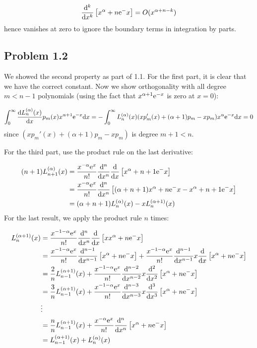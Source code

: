 \documentclass[12pt,a4paper]{article}
\def\D{ {\rm d} }
\def\E{ {\rm e} }
\def\dx{\D x}
\def\br[#1]{\left[{#1}\right]}
\begin{document}
\[
{\D^k \over \dx^k}\br[x^{\alpha+n}\E^{-x}]  = O(x^{\alpha+n-k})
\]
hence vanishes at zero to ignore the boundary terms in integration by parts.

\subsection{Problem 1.2}
We showed the second property as part of 1.1. For the first part, it is clear that we have the correct constant. Now we show orthogonality with all degree $m < n-1$ polynomials (using the fact that $x^{\alpha+1} \E^{-x}$ is zero at $x = 0$):

\[
\int_0^\infty {\D L_n^{(\alpha)}(x) \over \dx} p_m(x) x^{\alpha+1} \E^{-x} \dx = -\int_0^\infty L_n^{(\alpha)}(x) (x p_m'(x) + (\alpha+1) p_m - x p_m) x^{\alpha} \E^{-x} \dx = 0
\]
since $(x p_m'(x) + (\alpha+1) p_m - x p_m) $ is degree $m+1 < n$.

For the third part, use the product rule on the last derivative:


\begin{align*}
(n+1) L_{n+1}^{(\alpha)}(x) &= {x^{-\alpha}\E^x \over n!} {\D^{n} \over \dx^{n}} {\D \over \dx} \br[x^{\alpha+n+1} \E^{-x}] \\
  &= {x^{-\alpha}\E^x \over n!} {\D^{n} \over \dx^{n}}  \br[(\alpha+n+1)x^{\alpha+n} \E^{-x}-x^{\alpha+n+1} \E^{-x}]  \\
    &= (\alpha+n+1)L_n^{(\alpha)}(x) -   xL_n^{(\alpha+1)}(x)
\end{align*}
For the last result, we apply the product rule $n$ times:


\begin{align*}
L_{n}^{(\alpha+1)}(x) &= {x^{-1-\alpha}\E^x \over n!} {\D^{n} \over \dx^{n}} {\D \over \dx} \br[x x^{\alpha+n} \E^{-x}] \\
&= {x^{-1-\alpha}\E^x \over n!} {\D^{n-1} \over \dx^{n-1}} \br[ x^{\alpha+n} \E^{-x}]  + {x^{-1-\alpha}\E^x \over n!} {\D^{n-1} \over \dx^{n-1}} x {\D \over \dx} \br[ x^{\alpha+n} \E^{-x}]  \\
&= {2 \over n}L_{n-1}^{(\alpha+1)}(x)   + {x^{-1-\alpha}\E^x \over n!} {\D^{n-2} \over \dx^{n-2}} x {\D^2 \over \dx^2} \br[ x^{\alpha+n} \E^{-x}]  \\
&= {3 \over n}L_{n-1}^{(\alpha+1)}(x)   + {x^{-1-\alpha}\E^x \over n!} {\D^{n-3} \over \dx^{n-3}} x {\D^3 \over \dx^3} \br[ x^{\alpha+n} \E^{-x}]  \\
&\vdots\\
&={n \over n}L_{n-1}^{(\alpha+1)}(x)   + {x^{-\alpha}\E^x \over n!} {\D^{n} \over \dx^{n}}  \br[ x^{\alpha+n} \E^{-x}] \\
&=L_{n-1}^{(\alpha+1)}(x) + L_n^{(\alpha)}(x)
\end{align*}
\end{document}
